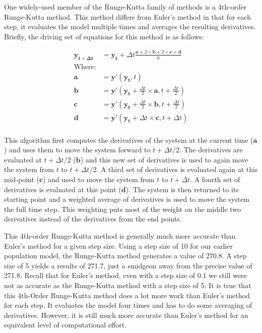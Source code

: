 \documentclass[]{memoir}
\begin{document}
One widely-used member of the Runge-Kutta family of methods is a
4th-order Runge-Kutta method. This method differs from Euler's method in
that for each step, it evaluates the model multiple times and averages
the resulting derivatives. Briefly, the driving set of equations for
this method is as follows:

\[
\begin{aligned}
\mathbf{y_{t+\Delta t}} &= \mathbf{y_{t}} + \Delta t \frac{\mathbf{a}+2 \times \mathbf{b}+2 \times \mathbf{c}+\mathbf{d}}{6} \\
\text{Where:} \\
\mathbf{a} &= \mathbf{y'}(\mathbf{y_t}, t) \\
\mathbf{b} &= \mathbf{y'}(\mathbf{y_t}+\frac{\Delta t}{2} \times \mathbf{a}, t+\frac{\Delta t}{2}) \\
\mathbf{c} &= \mathbf{y'}(\mathbf{y_t}+\frac{\Delta t}{2} \times \mathbf{b}, t+\frac{\Delta t}{2}) \\
\mathbf{d} &= \mathbf{y'}(\mathbf{y_t}+\Delta t \times \mathbf{c}, t+\Delta t) \\
\end{aligned}
\]

This algorithm first computes the derivatives of the system at the
current time ($\mathbf{a}$) and uses them to move the system forward to
$t+\Delta t/2$. The derivatives are evaluated at $t+\Delta t/2$
($\mathbf{b}$) and this new set of derivatives is used to again move the
system from $t$ to $t+\Delta t/2$. A third set of derivatives is
evaluated again at this mid-point ($\mathbf{c}$) and used to move the
system from $t$ to $t+\Delta t$. A fourth set of derivatives is
evaluated at this point ($\mathbf{d}$). The system is then returned to
its starting point and a weighted average of derivatives is used to move
the system the full time step. This weighting puts most of the weight on
the middle two derivatives instead of the derivatives from the end
points.

This 4th-order Runge-Kutta method is generally much more accurate than
Euler's method for a given step size. Using a step size of 10 for our
earlier population model, the Runge-Kutta method generates a value of
270.8. A step size of 5 yields a results of 271.7, just a smidgeon away
from the precise value of 271.8. Recall that for Euler's method, even
with a step size of 0.1 we still were not as accurate as the Runge-Kutta
method with a step size of 5. It is true that this 4th-Order Runge-Kutta
method does a lot more work than Euler's method for each step. It
evaluates the model four times and has to do some averaging of
derivatives. However, it is still much more accurate than Euler's method
for an equivalent level of computational effort.
\end{document}
